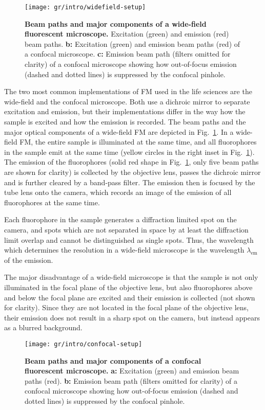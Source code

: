 \begin{figure}
  \texttt{[image: gr/intro/widefield-setup]}
  \caption{\textbf{Beam paths and major components of a wide-field fluorescent
      microscope.} Excitation (green) and emission (red) beam
    paths. \textbf{b:} Excitation (green) and
    emission beam paths (red) of a confocal microscope.  \textbf{c:} Emission
    beam path (filters omitted for clarity) of a confocal microscope showing
    how out-of-focus emission (dashed and dotted lines) is suppressed by the
    confocal pinhole.}
  \label{fig:FM-setups}
\end{figure}

The two most common implementations of FM used in the life sciences are the
wide-field and the confocal microscope. Both use a dichroic mirror to separate
excitation and emission, but their implementations differ in the way how the
sample is excited and how the emission is recorded. The beam paths and the
major optical components of a wide-field FM are depicted in
Fig.~\ref{fig:FM-setups}. In a wide-field FM, the
entire sample is illuminated at the same time, and all fluorophores in the sample
emit at the same time (yellow circles in the right inset in
Fig.~\ref{fig:FM-setups}). The emission of the fluorophores (solid red shape
in Fig.~\ref{fig:FM-setups}, only five beam paths are shown for clarity) is
collected by the objective lens, passes the dichroic mirror and is further
cleared by a band-pass filter. The emission then is focused by the tube lens
onto the camera, which records an image of the emission of all fluorophores at
the same time.

Each fluorophore in the sample generates a diffraction limited spot on the
camera, and spots which are not separated in space by at least the diffraction
limit overlap and cannot be distinguished as single spots. Thus, the
wavelength which determines the resolution in a wide-field microscope is the
wavelength $\lambda_\text{em}$ of the emission.

The major disadvantage of a wide-field microscope is that the sample is not
only illuminated in the focal plane of the objective lens, but also
fluorophores above and below the focal plane are excited and their
emission is collected (not shown for clarity). Since they are not located in
the focal plane of the objective lens, their emission does not result in a
sharp spot on the camera, but instead appears as a blurred background.    

\begin{figure}
  \texttt{[image: gr/intro/confocal-setup]}
  \caption{\textbf{Beam paths and major components of a confocal fluorescent
      microscope.} \textbf{a:} Excitation (green) and
    emission beam paths (red).  \textbf{b:} Emission
    beam path (filters omitted for clarity) of a confocal microscope showing
    how out-of-focus emission (dashed and dotted lines) is suppressed by the
    confocal pinhole.}
  \label{fig:confocal-setup}
\end{figure}



